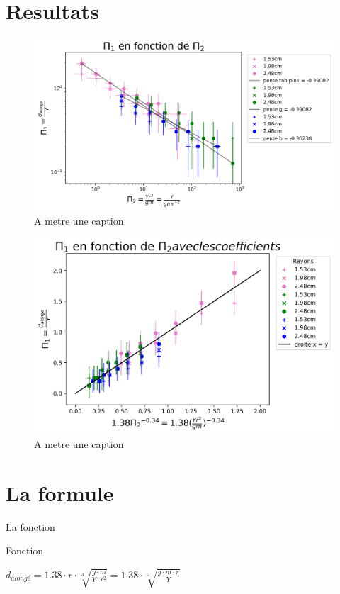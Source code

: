 \section{Resultats}
\begin{frame}
    \begin{figure}
        \centering
        \includegraphics[height=0.9\textheight]{../Tous.png}
        \caption{A metre une caption} %
        \label{fig:my_label}
    \end{figure}
\end{frame}

\begin{frame}
    \begin{figure}
        \centering
        \includegraphics[height=0.9\textheight]{../Ultime.png}
        \caption{A metre une caption} %
        \label{fig:my_label}
    \end{figure}
\end{frame}

\section{La formule}
\begin{frame}{La fonction}
    \begin{block}{Fonction}
        \begin{center}
            \(d_{alongé}=1.38\cdot r\cdot\sqrt[3]{\frac{g\cdot m}{Y\cdot r^2}}=1.38\cdot \sqrt[3]{\frac{g\cdot m \cdot r}{Y}}\)
        \end{center}
    \end{block}
\end{frame}